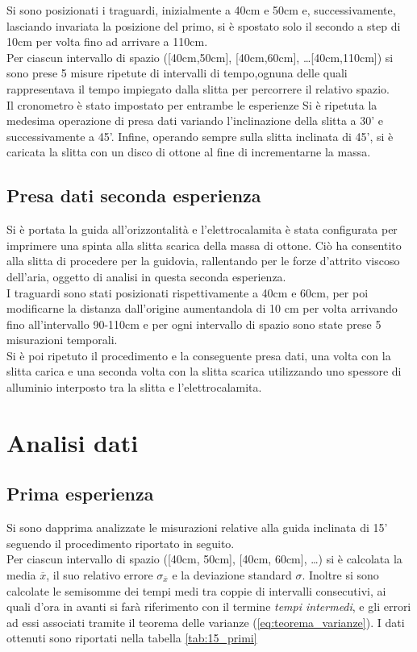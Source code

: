\documentclass[a4paper,11pt,oneside]{article}
\begin{document}
Si sono posizionati i traguardi, inizialmente a 40cm e 50cm e, successivamente, lasciando invariata la posizione del primo, si è spostato solo il secondo a step di 10cm per volta fino ad arrivare a 110cm. \\
Per ciascun intervallo di spazio ([40cm,50cm], [40cm,60cm], \dots [40cm,110cm]) si sono prese 5 misure ripetute di intervalli di tempo,ognuna delle quali rappresentava il tempo impiegato dalla slitta per percorrere il relativo spazio.\\  
Il cronometro è stato impostato per entrambe le esperienze
Si è ripetuta la medesima operazione di presa dati variando l'inclinazione della slitta a 30' e successivamente a 45'.
Infine, operando sempre sulla slitta inclinata di 45', si è caricata la slitta con un disco di ottone al fine di incrementarne la massa.

\subsection{Presa dati seconda esperienza}
Si è portata la guida all'orizzontalità e l'elettrocalamita è stata configurata per imprimere una spinta alla slitta scarica della massa di ottone. Ciò ha consentito alla slitta di procedere per la guidovia, rallentando per le forze d'attrito viscoso dell'aria, oggetto di analisi in questa seconda esperienza.\\
I traguardi sono stati posizionati rispettivamente a 40cm e 60cm, per poi modificarne la distanza dall'origine aumentandola di 10 cm per volta arrivando fino all'intervallo 90-110cm e per ogni intervallo di spazio sono state prese 5 misurazioni temporali.\\
Si è poi ripetuto il procedimento e la conseguente presa dati, una volta con la slitta carica e una seconda volta con la slitta scarica utilizzando uno spessore di alluminio interposto tra la slitta e l'elettrocalamita.

\section{Analisi dati}
\subsection{Prima esperienza}
Si sono dapprima analizzate le misurazioni relative alla guida inclinata di 15' seguendo il procedimento riportato in seguito.\\
Per ciascun intervallo di spazio ([40cm, 50cm], [40cm, 60cm], \dots) si è calcolata  la media $\overline{x}$, il suo relativo errore $\sigma_{\overline{x}}$ e la deviazione standard $\sigma$. Inoltre si sono calcolate le semisomme dei tempi medi tra coppie di intervalli consecutivi, ai quali d'ora in avanti si farà riferimento con il termine \textit{tempi intermedi}, e gli errori ad essi associati tramite il teorema delle varianze (\ref{eq:teorema_varianze}).
I dati ottenuti sono riportati nella tabella  \ref{tab:15_primi}
\end{document}
